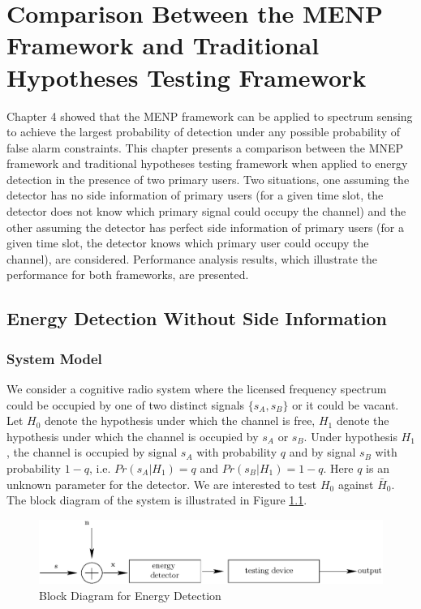 \chapter{Comparison Between the MENP Framework and Traditional Hypotheses Testing Framework}
Chapter 4 showed that the MENP framework can be applied to spectrum sensing to achieve the largest probability of detection under any possible probability of false alarm constraints. This chapter presents a comparison between the MNEP framework and traditional hypotheses testing framework when applied to energy detection in the presence of two primary users. Two situations, one assuming the detector has no side information of primary users (for a given time slot, the detector does not know which primary signal could occupy the channel) and the other assuming the detector has perfect side information of primary users (for a given time slot, the detector knows which primary user could occupy the channel), are considered.  
Performance analysis results, which illustrate the performance for both frameworks, are presented.

\section{Energy Detection Without Side Information}
\subsection{System Model}
We consider a cognitive radio system where the licensed frequency spectrum could be occupied by one of two distinct signals $\{s_A, s_B\}$ or it could be vacant. 
Let $H_0$ denote the hypothesis under which the channel is free, $H_1$ denote the hypothesis under which the channel is occupied by $s_A$ or $s_B$.
Under hypothesis $H_1$, the channel is occupied by signal $s_A$ with probability $q$ and by signal $s_B$ with probability $1-q$, i.e. $Pr(s_A|H_1) = q$ and  $Pr(s_B|H_1) = 1-q$. Here $q$ is an unknown parameter for the detector. 
We are interested to test $H_0$ against $\bar{H}_0$. The block diagram of the system is illustrated in Figure \ref{pic: ch5 diagram}.  

\begin{figure}[!hbp]
\centering
\includegraphics[width = \textwidth]{5/fig4.eps}
\caption{Block Diagram for Energy Detection}
\label{pic: ch5 diagram}
\end{figure}

